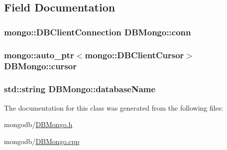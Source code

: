 \subsection{\-Field \-Documentation}
\hypertarget{classDBMongo_a59aa9f1b562885e5b71203d4c895d8b5}{
\subsubsection[{conn}]{\setlength{\rightskip}{0pt plus 5cm}mongo\-::\-D\-B\-Client\-Connection {\bf \-D\-B\-Mongo\-::conn}}}\label{classDBMongo_a59aa9f1b562885e5b71203d4c895d8b5}
\hypertarget{classDBMongo_a6d32ad7e532966a638885cf6b8975c87}{
\subsubsection[{cursor}]{\setlength{\rightskip}{0pt plus 5cm}mongo\-::auto\-\_\-ptr$<$mongo\-::\-D\-B\-Client\-Cursor$>$ {\bf \-D\-B\-Mongo\-::cursor}}}\label{classDBMongo_a6d32ad7e532966a638885cf6b8975c87}
\hypertarget{classDBMongo_a727f1eb39d182ce873ce8e242eeaa226}{
\subsubsection[{database\-Name}]{\setlength{\rightskip}{0pt plus 5cm}std\-::string {\bf \-D\-B\-Mongo\-::database\-Name}}}\label{classDBMongo_a727f1eb39d182ce873ce8e242eeaa226}


\-The documentation for this class was generated from the following files\-:\begin{DoxyCompactItemize}
\item 
mongodb/\hyperlink{DBMongo_8h}{\-D\-B\-Mongo.\-h}\item 
mongodb/\hyperlink{DBMongo_8cpp}{\-D\-B\-Mongo.\-cpp}\end{DoxyCompactItemize}
